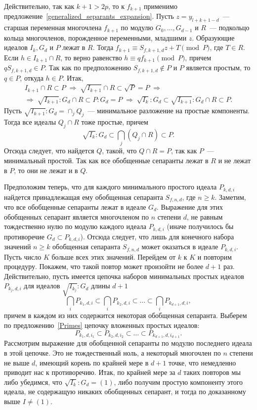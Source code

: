\documentclass[11pt]{article}
\renewcommand{\ge}{\geqslant}
\theoremstyle{plain1}
\theoremstyle{plain2}
\theoremstyle{plain}
\theoremstyle{plain3}
\theoremstyle{definition}
\theoremstyle{remark}
\begin{document}
Действительно, так как $k+1 > 2p$, то к $f_{k+1}$ применимо предложение~\ref{generalized_separants_expansion}. 
Пусть $z = y_{l+k+1-d}$~--- старшая переменная многочлена $f_{k+1}$ по модулю $G_0, \ldots, G_{d-1}$
и $R$~--- подкольцо кольца многочленов, порожденное переменными, младшими $z$. 
Образующие идеалов $I_k, G_d$ и $P$ лежат в $R$.
Тогда $f_{k+1} \equiv S_{f,k+1,d} z + T \pmod P$, где $T \in R$.
Если $h \in I_{k+1} \cap R$, то верно равенство
$h \equiv q f_{k+1} \pmod P$, причем $q S_{f,k+1,d} \in P$.
Так как по предположению $S_{f,k+1,d} \notin P$ и $P$ является простым, то $q \in P$,
откуда $h \in P$. Итак,
\begin{gather*}
 I_{k+1} \cap R \subset P \; \Longrightarrow \; \sqrt{I_{k+1}} \cap R \subset \sqrt{P} = P \; \Longrightarrow \\
 \Longrightarrow \; \sqrt{I_{k+1}}:G_d \cap R \subset P:G_d = P \; \Longrightarrow \; \sqrt{I_k}:G_d \subset \sqrt{I_{k+1}}:G_d \cap R \subset P.
\end{gather*}
Пусть $\sqrt{I_{k+1}}:G_d = \cap_j Q_j$~--- минимальное разложение на простые компоненты.
Тогда все идеалы $Q_j \cap R$ тоже простые, причем
$$
 \sqrt{I_k}:G_d \subset \bigcap_j \left( Q_j \cap R \right) \subset P.
$$
Отсюда следует, что найдется $Q$, такой, что $Q \cap R = P$, так как $P$~--- минимальный простой.
Так как все обобщенные сепаранты лежат в $R$ и не лежат в $P$, то они не лежат и в $Q$.

\bigskip

Предположим теперь, что для каждого минимального простого идеала $P_{k,d,i}$
найдется принадлежащая ему обобщенная сепаранта $S_{f,n,d}$, где $n \ge k$.
Заметим, что все обобщенные сепаранты лежат в идеале $G_d$.
Выражение для этих обобщенных сепарант является многочленом по $n$ степени $d$,
не равным тождественно нулю по модулю каждого идеала $P_{k,d,i}$ (иначе получилось бы противоречие $G_d \subset P_{k,d,i}$).
Отсюда следует, что лишь для конечного набора значений $n \ge k$ обобщенная сепаранта $S_{f,n,d}$ может оказаться в идеале $P_{k,d,i}$.
Пусть число $K$ больше всех этих значений. Перейдем от $k$ к $K$ и повторим процедуру. Покажем, что такой повтор может произойти не более $d+1$ раз. Действительно, пусть имеется цепочка наборов минимальных простых идеалов $P_{k_j, d, i}$ для идеалов $\sqrt{I_{k_j}}:G_d$ длины $d+1$
$$
 \bigcap_i P_{k_1, d, i} \subset \bigcap_i P_{k_2, d, i} \subset \ldots \subset \bigcap_i P_{k_{d+1}, d, i},
$$
причем в каждом из них содержится некоторая обобщенная сепаранта.
Выберем по предложению~\ref{Primes} цепочку вложенных простых идеалов:
$$
 P_{k_1, d, i_1} \subset P_{k_2, d, i_2} \subset \ldots \subset P_{k_{d+1}, d, i_{d+1}}.
$$
Рассмотрим выражение для обобщенной сепаранты по модулю последнего идеала в этой цепочке. Это не тождественный ноль,
а некоторый многочлен по $n$ степени не выше $d$, имеющий корень по крайней мере в $d+1$ точке, что немедленно приводит нас к противоречию.
Итак, по крайней мере за $d$ таких повторов мы либо убедимся, что $\sqrt{I_k}:G_d = (1)$, либо получим простую компоненту этого идеала, не содержащую никаких обобщенных сепарант, и тогда по доказанному выше $I \ne (1)$.
\end{document}

